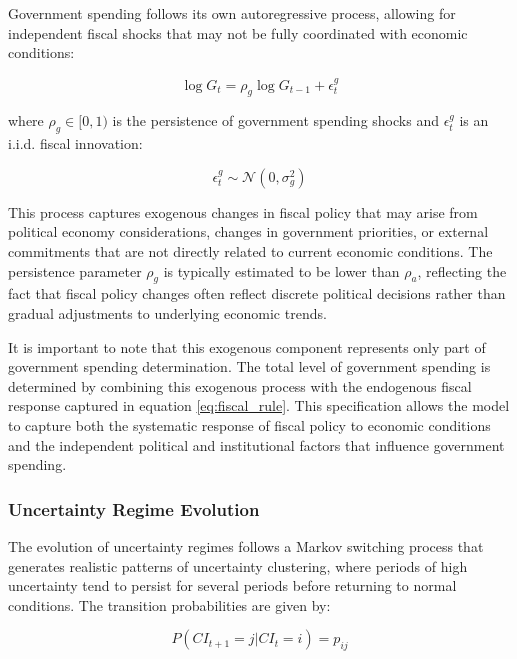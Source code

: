 \documentclass[5p,authoryear]{elsarticle}
\begin{document}
Government spending follows its own autoregressive process, allowing for independent fiscal shocks that may not be fully coordinated with economic conditions:

\begin{equation}
\log G_t = \rho_g \log G_{t-1} + \epsilon_t^g
\label{eq:government_process}
\end{equation}

where $\rho_g \in [0,1)$ is the persistence of government spending shocks and $\epsilon_t^g$ is an i.i.d. fiscal innovation:

\begin{equation}
\epsilon_t^g \sim \mathcal{N}(0, \sigma_g^2)
\label{eq:government_shock}
\end{equation}

This process captures exogenous changes in fiscal policy that may arise from political economy considerations, changes in government priorities, or external commitments that are not directly related to current economic conditions. The persistence parameter $\rho_g$ is typically estimated to be lower than $\rho_a$, reflecting the fact that fiscal policy changes often reflect discrete political decisions rather than gradual adjustments to underlying economic trends.

It is important to note that this exogenous component represents only part of government spending determination. The total level of government spending is determined by combining this exogenous process with the endogenous fiscal response captured in equation \eqref{eq:fiscal_rule}. This specification allows the model to capture both the systematic response of fiscal policy to economic conditions and the independent political and institutional factors that influence government spending.

\subsubsection{Uncertainty Regime Evolution}

The evolution of uncertainty regimes follows a Markov switching process that generates realistic patterns of uncertainty clustering, where periods of high uncertainty tend to persist for several periods before returning to normal conditions. The transition probabilities are given by:

\begin{equation}
P(CI_{t+1} = j | CI_t = i) = p_{ij}
\label{eq:uncertainty_transition}
\end{equation}
\end{document}
